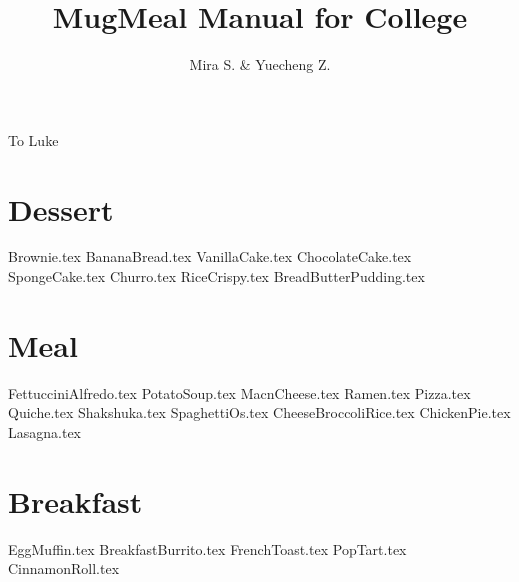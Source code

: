 \documentclass{article}
\title{MugMeal Manual for College}
\author{Mira S. \& Yuecheng Z.}
\begin{document}
\maketitle
\newpage
\null{}
\vspace{5em}
\begin{LARGE} 
\hspace{3em}To Luke
\end{LARGE}
\newpage
\tableofcontents
\setcounter{tocdepth}{2}


\newpage
\section{Dessert} 
\localtableofcontents
{Brownie.tex}
{BananaBread.tex}
{VanillaCake.tex}
{ChocolateCake.tex}
{SpongeCake.tex}
{Churro.tex}
{RiceCrispy.tex}
{BreadButterPudding.tex}


\newpage
\section{Meal} 
\localtableofcontents
{FettucciniAlfredo.tex}
{PotatoSoup.tex}
{MacnCheese.tex}
{Ramen.tex}
{Pizza.tex}
{Quiche.tex}
{Shakshuka.tex}
{SpaghettiOs.tex}
{CheeseBroccoliRice.tex}
{ChickenPie.tex}
{Lasagna.tex}


\newpage
\section {Breakfast}
\localtableofcontents
{EggMuffin.tex}
{BreakfastBurrito.tex}
{FrenchToast.tex}
{PopTart.tex}
{CinnamonRoll.tex}
\end{document}
